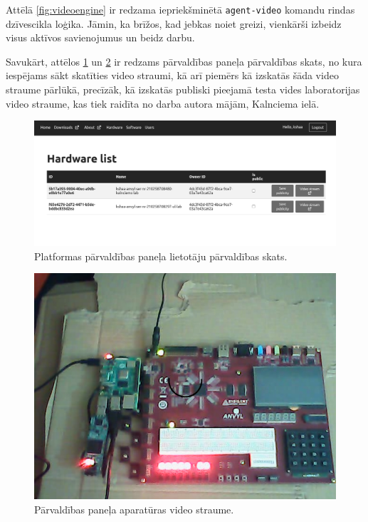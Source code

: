 Attēlā \ref{fig:videoengine} ir redzama iepriekšminētā \lstinline!agent-video!
komandu rindas  dzīvescikla loģika. Jāmin, ka brīžos,
kad jebkas noiet greizi,  vienkārši izbeidz visus
aktīvos savienojumus un beidz darbu.

Savukārt, attēlos \ref{fig:mgmtpanelhw} un \ref{fig:hwstream} ir redzams
pārvaldības paneļa  pārvaldības skats, no kura
iespējams sākt skatīties  video straumi, kā arī
piemērs kā izskatās šāda video straume pārlūkā, precīzāk, kā izskatās publiski
pieejamā \cite{VeinbahsKrisjanisProduction} testa vides laboratorijas video
straume, kas tiek raidīta no darba autora mājām, Kalnciema ielā.

\begin{figure}[H]
    \includegraphics[width=0.9\linewidth]{assets/mgmt-panel-hw-gray.png}
    \centering
    \caption{Platformas pārvaldības paneļa lietotāju pārvaldības skats.}
    \label{fig:mgmtpanelhw}
\end{figure}

\begin{figure}[H]
    \includegraphics[width=0.9\linewidth]{assets/webcam-usage.png}
    \centering
    \caption{Pārvaldības paneļa aparatūras video straume.}
    \label{fig:hwstream}
\end{figure}

